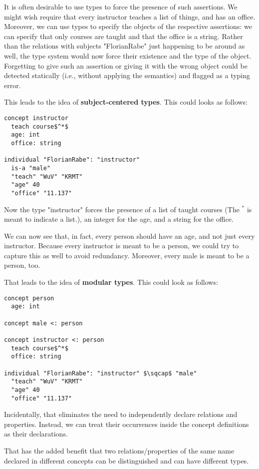 It is often desirable to use types to force the presence of such assertions.
We might wish require that every instructor teaches a list of things, and has an office.
Moreover, we can use types to specify the objects of the respective assertions: we can specify that only courses are taught and that the office is a string.
Rather than the relations with subjects "FlorianRabe" just happening to be around as well, the type system would now force their existence and the type of the object.
Forgetting to give such an assertion or giving it with the wrong object could be detected statically (i.e., without applying the semantics) and flagged as a typing error.

This leads to the idea of \textbf{subject-centered types}.
This could looks as follows:
\begin{lstlisting}
concept instructor
  teach course$^*$
  age: int
  office: string

individual "FlorianRabe": "instructor"
  is-a "male"
  "teach" "WuV" "KRMT"
  "age" 40
  "office" "11.137"
\end{lstlisting}
Now the type "instructor" forces the presence of a list of taught courses (The $^*$ is meant to indicate a list.), an integer for the age, and a string for the office.

We can now see that, in fact, every person should have an age, and not just every instructor.
Because every instructor is meant to be a person, we could try to capture this as well to avoid redundancy.
Moreover, every male is meant to be a person, too.

That leads to the idea of \textbf{modular types}.
This could look as follows:

\begin{lstlisting}
concept person
  age: int
  
concept male <: person

concept instructor <: person
  teach course$^*$
  office: string

individual "FlorianRabe": "instructor" $\sqcap$ "male"
  "teach" "WuV" "KRMT"
  "age" 40
  "office" "11.137"
\end{lstlisting}

Incidentally, that eliminates the need to independently declare relations and properties.
Instead, we can treat their occurrences inside the concept definitions as their declarations.

That has the added benefit that two relations/properties of the same name declared in different concepts can be distinguished and can have different types.

